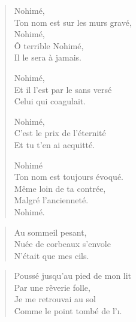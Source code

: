 \begin{verse}\quintil\tercet
  Nohimé,\\  %
  Ton nom est sur les murs gravé,\\  %
  Nohimé,\\  %
  Ô terrible Nohimé,\\  %
  Il le sera à jamais.

  Nohimé,\\  %
  Et il l’est par le sans versé\\  %
  Celui qui coagulait.

  Nohimé,\\  %
  C’est le prix de l’éternité\\  %
  Et tu t’en ai acquitté.

  Nohimé\\  %
  Ton nom est toujours évoqué.\\  %
  Même loin de ta contrée,\\   %
  Malgré l’ancienneté.\\  %
  Nohimé. 
\end{verse}

\begin{verse}\haiku
  Au sommeil pesant,\\  %
  Nuée de corbeaux s’envole\\  %
  N’était que mes cils.
\end{verse}

\begin{verse}\quatrain
  Poussé jusqu’au pied de mon lit\\  %
  Par une rêverie folle,\\   %
  Je me retrouvai au sol\\  %
  Comme le point tombé de l’ı. 
\end{verse}

